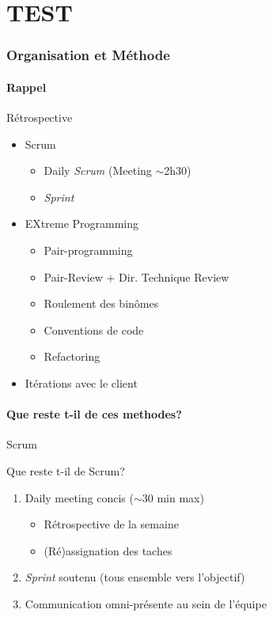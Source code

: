 
\part{TEST}
\section{Organisation et Méthode}

\subsection{Rappel}

\begin{frame}{Rétrospective}
  \begin{block}{}
    \begin{itemize}
      \item Scrum
        \begin{itemize}
          \item Daily \emph{Scrum} (Meeting $\sim$2h30)
          \item \emph{Sprint}
        \end{itemize}
      \item EXtreme Programming
        \begin{itemize}
          \item Pair-programming
          \item Pair-Review + Dir. Technique Review
          \item Roulement des binômes
          \item Conventions de code
          \item Refactoring
        \end{itemize}
      \item Itérations avec le client
   \end{itemize}
  \end{block}
\end{frame}

\subsection{Que reste t-il de ces methodes?}

\begin{frame}{Scrum}
  \begin{block}{Que reste t-il de Scrum?}
    \begin{enumerate}
      \item Daily meeting concis ($\sim$30 min max)
        \begin{itemize}
          \item Rétrospective de la semaine
          \item (Ré)assignation des taches
        \end{itemize}
      \item \emph{Sprint} soutenu (tous ensemble vers l'objectif)
      \item Communication omni-présente au sein de l'équipe
    \end{enumerate}
  \end{block}
\end{frame}

